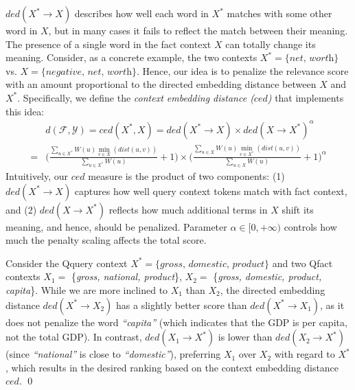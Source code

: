 $ded(X^* \rightarrow X)$ describes how well each word in $X^*$ matches with some other word in $X$, but in many cases it fails to reflect the match between their meaning. The presence of a single word in the fact context $X$ can totally change its meaning. Consider, as a concrete example, the two contexts $X^*=\{\textit{net, worth}\}$ vs. $X = \{\textit{negative, net, worth}\}$. Hence, our idea is to penalize the relevance score with an amount proportional to the directed embedding distance between $X$ and $X^*$.
Specifically, we define the \textit{context embedding distance ($ced$)} that implements this idea:
\begin{align*}
&d(\mathcal{F}, \mathcal{Y}) = ced(X^*, X) = ded(X^* \rightarrow X) \times ded(X \rightarrow X^*)^\alpha \\
=& \Bigg( \frac{\sum\limits_{u \in X^*} W(u)\min\limits_{v \in X}(dist(u,v))}{\sum\limits_{u \in X^*}W(u)} + 1 \Bigg) \times \Bigg( \frac{\sum\limits_{u \in X} W(u)\min\limits_{v \in X^*}(dist(u,v))}{\sum\limits_{u \in X}W(u)} +1 \Bigg)^\alpha 
\end{align*}
Intuitively, our $ced$ measure is the product of two components: (1) $ded(X^* \rightarrow X)$ captures how well query context tokens match with fact context, and (2) $ded(X \rightarrow X^*)$ reflects how much additional terms in $X$ shift its meaning, and hence, should be penalized. Parameter $\alpha \in [0,+\infty)$ controls how much the penalty scaling affects the total score.

\begin{example} Consider the Qquery context $X^* = \{\textit{gross, domestic, product}\}$ and two Qfact contexts $X_1 =$ \{\textit{gross, national, product}\}, $X_2 =$  \{\textit{gross, domestic, product, capita}\}. While we are more inclined to $X_1$ than $X_2$, the directed embedding distance $ded(X^* \rightarrow X_2)$ has a slightly better score than $ded(X^* \rightarrow X_1)$, as it does not penalize the word \textit{``capita''}
(which indicates that the GDP is per capita, not the total GDP). 
In contrast, $ded(X_1 \rightarrow X^*)$ is lower than $ded(X_2 \rightarrow X^*)$ (since \textit{``national''} is close to \textit{``domestic''}), preferring $X_1$ over $X_2$ with regard to $X^*$, which results in the desired ranking based on the context embedding distance $ced$. \qed
\end{example}

